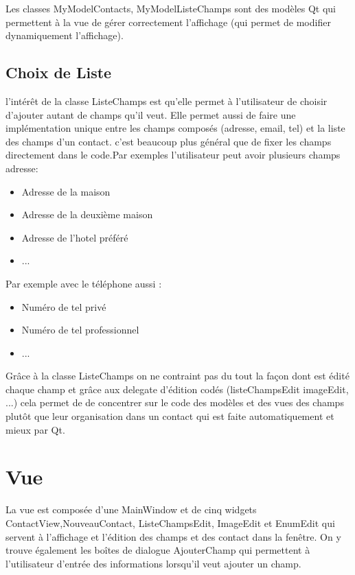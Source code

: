 \documentclass{report}
\begin{document}
Les classes MyModelContacts, MyModelListeChamps
sont des modèles Qt qui permettent à la vue de gérer correctement l'affichage (qui
permet de modifier dynamiquement l'affichage).
\subsection{Choix de Liste}
l'intérêt de la classe ListeChamps est  qu'elle permet à l'utilisateur de choisir d'ajouter autant de champs qu'il veut. Elle permet aussi de faire une implémentation unique entre les champs composés (adresse, email, tel) et la liste des champs d'un contact.
c'est beaucoup plus général que de fixer les champs directement dans le code.Par exemples l'utilisateur peut avoir plusieurs champs adresse: 
\begin{itemize}
\item Adresse de la maison
\item Adresse de la deuxième maison
\item Adresse de l'hotel préféré
\item ...
\end{itemize}
Par exemple avec  le téléphone aussi : 
\begin{itemize}
\item Numéro de tel privé
\item Numéro de tel professionnel
\item ...
\end{itemize}
Grâce à la classe ListeChamps on ne contraint pas du tout la façon dont est édité chaque champ et grâce aux delegate d'édition codés (listeChampsEdit imageEdit, ...) cela permet de de concentrer sur le code des modèles et des vues des champs plutôt que leur organisation dans un contact qui est faite automatiquement et mieux par Qt.



\section{Vue}
La vue est composée d’une MainWindow et de cinq widgets ContactView,NouveauContact, ListeChampsEdit, ImageEdit et EnumEdit qui servent à l'affichage et l’édition des champs et des contact dans la fenêtre.
On y trouve également les boîtes de dialogue AjouterChamp qui permettent à l’utilisateur d’entrée des informations lorsqu’il veut  ajouter un champ.
\end{document}
